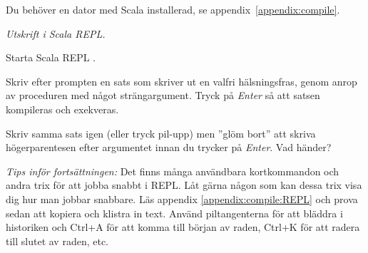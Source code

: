 
\ifPreSolution
\Exercise{\ExeWeekONE}\label{exe:W01}

\begin{Goals}

\end{Goals}

\begin{Preparations}
\item {}
\item Du behöver en dator med Scala installerad, se appendix~\ref{appendix:compile}.
\end{Preparations}

\fi  %



\BasicTasks



\def\what{\emph{Utskrift i Scala REPL.}}

\QUESTBEGIN

\Task \what 

\vspace{1em}\noindent Starta Scala REPL .


\Subtask Skriv efter prompten  en sats som skriver ut en valfri hälsningsfras, genom anrop av proceduren  med något strängargument. Tryck på \textit{Enter} så att satsen kompileras och exekveras. 

\Subtask Skriv samma sats igen (eller tryck pil-upp) men ''glöm bort'' att skriva högerparentesen efter argumentet innan du trycker på \textit{Enter}. Vad händer?

\begin{framed}
\noindent\emph{Tips inför fortsättningen:} Det finns många användbara kortkommandon och andra trix för att jobba snabbt i REPL. Låt gärna någon som kan dessa trix visa dig hur man jobbar snabbare. Läs appendix \ref{appendix:compile:REPL} och prova sedan att kopiera och klistra in text. Använd piltangenterna för att bläddra i historiken och Ctrl+A för att komma till början av raden, Ctrl+K för att radera till slutet av raden, etc.
\end{framed}


